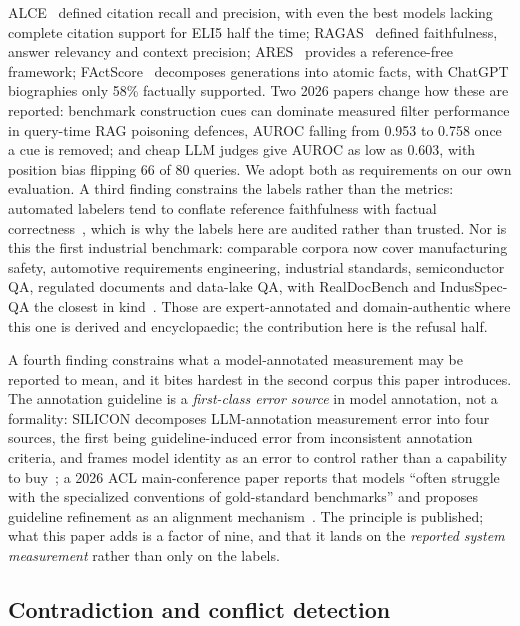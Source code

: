 \documentclass[conference]{IEEEtran}
\begin{document}
ALCE~\cite{gao2023alce} defined citation recall and precision, with even the
best models lacking complete citation support for ELI5 half the time;
RAGAS~\cite{es2024ragas} defined faithfulness, answer relevancy and context
precision; ARES~\cite{saadfalcon2024ares} provides a reference-free framework;
FActScore~\cite{min2023factscore} decomposes generations into atomic facts,
with ChatGPT biographies only 58\% factually supported. Two 2026 papers change
how these are reported: benchmark construction cues can dominate measured
filter performance in query-time RAG poisoning defences, AUROC falling from
0.953 to 0.758 once a cue is removed; and cheap LLM judges give AUROC as low as
0.603, with position bias flipping 66 of 80 queries. We adopt both as
requirements on our own evaluation. A third finding constrains the labels
rather than the metrics: automated labelers tend to conflate reference
faithfulness with factual correctness~\cite{valjakka2026labeling}, which is
why the labels here are audited rather than trusted. Nor is this the first
industrial benchmark: comparable corpora now cover manufacturing safety,
automotive requirements engineering, industrial standards, semiconductor QA,
regulated documents and data-lake QA, with RealDocBench and IndusSpec-QA the
closest in kind~\cite{joshi2026realdocbench,park2026induspecqa}. Those are
expert-annotated and domain-authentic where this one is derived and
encyclopaedic; the contribution here is the refusal half.

A fourth finding constrains what a model-annotated measurement may be
reported to mean, and it bites hardest in the second corpus this paper
introduces. The annotation guideline is a \emph{first-class error source} in
model annotation, not a formality: SILICON decomposes LLM-annotation
measurement error into four sources, the first being guideline-induced error
from inconsistent annotation criteria, and frames model identity as an error
to control rather than a capability to buy~\cite{cheng2024silicon}; a 2026
ACL main-conference paper reports that models ``often struggle with the
specialized conventions of gold-standard benchmarks'' and proposes guideline
refinement as an alignment mechanism~\cite{kim2026guidelines}. The principle
is published; what this paper adds is a factor of nine, and that it lands on
the \emph{reported system measurement} rather than only on the labels.

\subsection{Contradiction and conflict detection}
\end{document}
